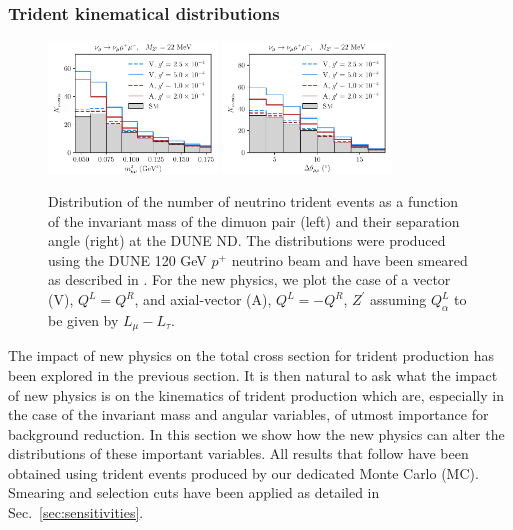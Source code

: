 \subsubsection{Trident kinematical distributions \label{sec:trident_kinematics}}
%
\begin{figure}[t]
%
\centering
%
\includegraphics[width=0.4\textwidth]{BSM_invmass_mumu.pdf}
\includegraphics[width=0.4\textwidth]{BSM_sepangle_mumu.pdf}
%
\caption{
Distribution of the number of neutrino trident events as a function of the invariant mass of the dimuon pair (left) and their separation angle (right) at the DUNE ND. The distributions were produced using the DUNE 120 GeV $p^+$ neutrino beam and have been smeared as described in . For the new physics, we plot the case of a vector (V), $Q^L = Q^R$, and axial-vector (A), $Q^L = -Q^R$,  $Z^\prime$ assuming $Q^L_{\alpha}$ to be given by $L_\mu - L_\tau$. \label{fig:mm_spectra}}
\end{figure}
%
The impact of new physics on the total cross section for trident production has been explored in the previous section. It is then natural to ask what the impact of new physics is on the kinematics of trident production which are, especially in the case of the invariant mass and angular variables, of utmost importance for background reduction. In this section we show how the new physics can alter the distributions of these important variables. All results that follow have been obtained using trident events produced by our dedicated Monte Carlo (MC). Smearing and selection cuts have been applied as detailed in Sec.~\ref{sec:sensitivities}.

